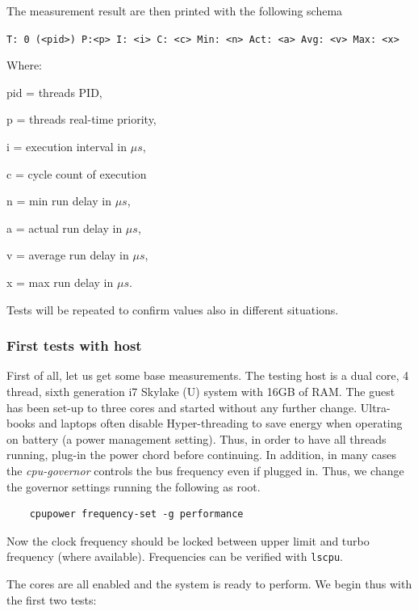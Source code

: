 \documentclass[]{scrartcl}
\begin{document}
The measurement result are then printed with the following schema
\bigskip

\noindent \small \texttt{T: 0 (<pid>) P:<p> I: <i> C: <c> Min: <n> Act: <a> Avg: <v> Max: <x>}
\bigskip

Where:
\begin{where}
	\item[pid =] threads PID,
	\item[p =] threads real-time priority,
	\item[i =] execution interval in $\mu s$,
	\item[c =] cycle count of execution
	\item[n =] min run delay in $\mu s$,
	\item[a =] actual run delay in $\mu s$,
	\item[v =] average run delay in $\mu s$,
	\item[x =] max run delay in $\mu s$.
\end{where} 

Tests will be repeated to confirm values also in different situations.

\subsubsection{First tests with host}

First of all, let us get some base measurements. The testing host is a dual core, 4 thread, sixth generation i7 Skylake (U) system with 16GB of RAM. The guest has been set-up to three cores
and started without any further change. 
Ultra-books and laptops often disable Hyper-threading to save energy when operating on battery (a power management setting). Thus, in order to have all threads running, plug-in the power chord before continuing.
In addition, in many cases the \textit{cpu-governor} controls the bus frequency even if plugged in. Thus, we change the governor settings running the following as root. 

\begin{verbatim}
	cpupower frequency-set -g performance
\end{verbatim}

Now the clock frequency should be locked between upper limit and turbo frequency (where available). Frequencies can be verified with \texttt{lscpu}. 

The cores are all enabled and the system is ready to perform.
We begin thus with the first two tests:

\bigskip
\end{document}
